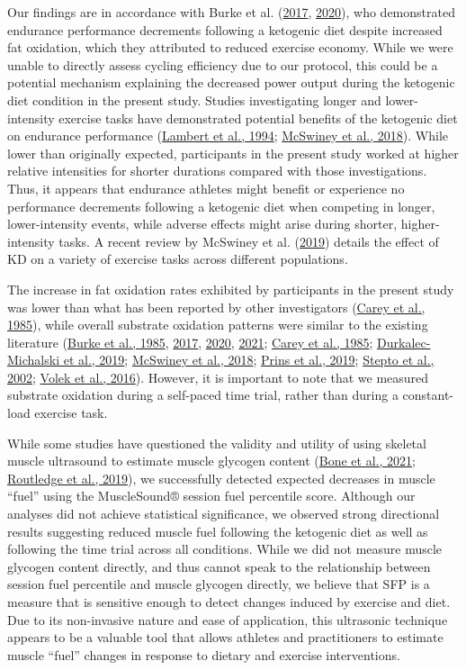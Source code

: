 \documentclass[]{cik}%
\begin{document}
Our findings are in accordance with Burke et al.
(\protect\hyperlink{ref-19}{2017}, \protect\hyperlink{ref-20}{2020}),
who demonstrated endurance performance decrements following a ketogenic
diet despite increased fat oxidation, which they attributed to reduced
exercise economy. While we were unable to directly assess cycling
efficiency due to our protocol, this could be a potential mechanism
explaining the decreased power output during the ketogenic diet
condition in the present study. Studies investigating longer and
lower-intensity exercise tasks have demonstrated potential benefits of
the ketogenic diet on endurance performance
(\protect\hyperlink{ref-7}{Lambert et al., 1994};
\protect\hyperlink{ref-22}{McSwiney et al., 2018}). While lower than
originally expected, participants in the present study worked at higher
relative intensities for shorter durations compared with those
investigations. Thus, it appears that endurance athletes might benefit
or experience no performance decrements following a ketogenic diet when
competing in longer, lower-intensity events, while adverse effects might
arise during shorter, higher-intensity tasks. A recent review by
McSwiney et al. (\protect\hyperlink{ref-52}{2019}) details the effect of
KD on a variety of exercise tasks across different populations.

The increase in fat oxidation rates exhibited by participants in the
present study was lower than what has been reported by other
investigators (\protect\hyperlink{ref-6}{Carey et al., 1985}), while
overall substrate oxidation patterns were similar to the existing
literature (\protect\hyperlink{ref-18}{Burke et al., 1985},
\protect\hyperlink{ref-19}{2017}, \protect\hyperlink{ref-20}{2020},
\protect\hyperlink{ref-16}{2021}; \protect\hyperlink{ref-6}{Carey et
al., 1985}; \protect\hyperlink{ref-21}{Durkalec-Michalski et al., 2019};
\protect\hyperlink{ref-22}{McSwiney et al., 2018};
\protect\hyperlink{ref-23}{Prins et al., 2019};
\protect\hyperlink{ref-24}{Stepto et al., 2002};
\protect\hyperlink{ref-17}{Volek et al., 2016}). However, it is
important to note that we measured substrate oxidation during a
self-paced time trial, rather than during a constant-load exercise task.

While some studies have questioned the validity and utility of using
skeletal muscle ultrasound to estimate muscle glycogen content
(\protect\hyperlink{ref-45}{Bone et al., 2021};
\protect\hyperlink{ref-46}{Routledge et al., 2019}), we successfully
detected expected decreases in muscle ``fuel'' using the MuscleSound®
session fuel percentile score. Although our analyses did not achieve
statistical significance, we observed strong directional results
suggesting reduced muscle fuel following the ketogenic diet as well as
following the time trial across all conditions. While we did not measure
muscle glycogen content directly, and thus cannot speak to the
relationship between session fuel percentile and muscle glycogen
directly, we believe that SFP is a measure that is sensitive enough to
detect changes induced by exercise and diet. Due to its non-invasive
nature and ease of application, this ultrasonic technique appears to be
a valuable tool that allows athletes and practitioners to estimate
muscle ``fuel'' changes in response to dietary and exercise
interventions.
\end{document}
